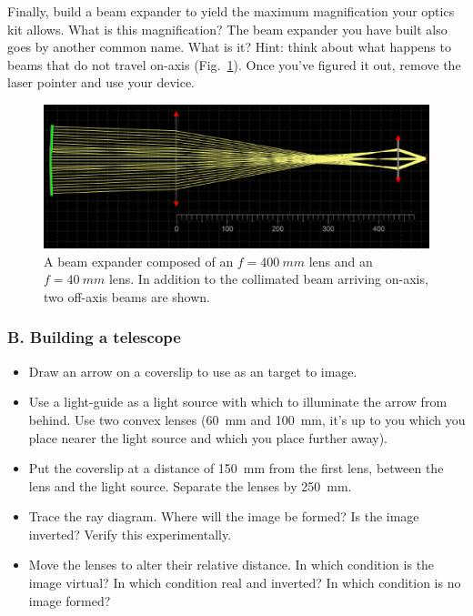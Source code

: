 \documentclass[a4paper]{report}
\begin{document}
Finally, build a beam expander to yield the maximum magnification your optics kit allows. 
What is this magnification?
The beam expander you have built also goes by another common name. 
What is it? 
Hint: think about what happens to beams that do not travel on-axis (Fig.~\ref{fig:telescope}).
Once you've figured it out, remove the laser pointer and use your device. 
\begin{figure}[h]
\center
\includegraphics[width=4.5in]{telescope_ray_diag.eps}
\caption{A beam expander composed of an $f=400~mm$ lens and an $f=40~mm$ lens. 
In addition to the collimated beam arriving on-axis, two off-axis beams are shown.}
\label{fig:telescope}
\end{figure}

\clearpage

\subsubsection{B. Building a telescope}
\begin{itemize}
\item Draw an arrow on a coverslip to use as an target to image. 
\item Use a light-guide as a light source with which to illuminate the arrow from behind. 
Use two convex lenses (60~mm and 100~mm, it's up to you which you place nearer the light source and which you place further away). 
\item Put the coverslip at a distance of 150~mm from the first lens, between the lens and the light source. 
Separate the lenses by 250~mm. 
\item Trace the ray diagram. Where will the image be formed? Is the image inverted?  Verify this experimentally. 
\item Move the lenses to alter their relative distance. In which condition is the image virtual? In
which condition real and inverted? In which condition is no image formed?
\end{itemize}
\end{document}
